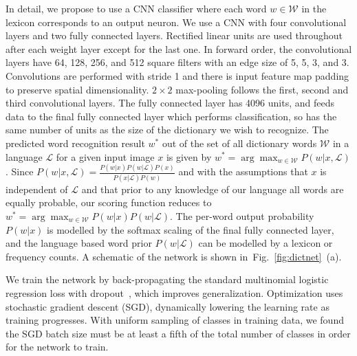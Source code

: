 \documentclass{article} \usepackage{nips14submit_e,times}
\newcommand{\figref}[1]{Fig.~\ref{#1}}
\newcommand{\dict}{\mathcal{W}}
\renewcommand{\paragraph}[1]{\par\noindent{\bf #1}}
\begin{document}
In detail, we propose to use a CNN classifier where each word $w\in\dict$ in the lexicon corresponds to an output neuron. We use a CNN with four convolutional layers and two fully connected layers. Rectified linear units are used throughout after each weight layer except for the last one. In forward order, the convolutional layers have 64, 128, 256, and 512 square filters with an edge size of 5, 5, 3, and 3. Convolutions are performed with stride 1 and there is input feature map padding to preserve spatial dimensionality. $2 \times 2$ max-pooling follows the first, second and third convolutional layers. The fully connected layer has 4096 units, and feeds data to the final fully connected layer which performs classification, so has the same number of units as the size of the dictionary we wish to recognize. The predicted word recognition result $w^*$ out of the set of all dictionary words $\dict$ in a language $\mathcal{L}$ for a given input image $x$ is given by $w^* = \arg\max_{w \in \dict} P(w|x,\mathcal{L})$. Since $P(w|x,\mathcal{L}) = \frac{P(w|x)P(w|\mathcal{L})P(x)}{P(x|\mathcal{L})P(w)}$ and with the assumptions that $x$ is independent of $\mathcal{L}$ and that prior to any knowledge of our language all words are equally probable, our scoring function reduces to $w^* = \arg\max_{w \in \dict} P(w|x)P(w|\mathcal{L})$. The per-word output probability $P(w|x)$ is modelled by the softmax scaling of the final fully connected layer, and the language based word prior $P(w|\mathcal{L})$ can be modelled by a lexicon or frequency counts. A schematic of the network is shown in~\figref{fig:dictnet}~(a).

\paragraph{Training.}
We train the network by back-propagating the standard multinomial logistic regression loss with dropout~\cite{Hinton12}, which improves generalization. Optimization uses stochastic gradient descent (SGD), dynamically lowering the learning rate as training progresses. With uniform sampling of classes in training data, we found the SGD batch size must be at least a fifth of the total number of classes in order for the network to train. 
\end{document}
